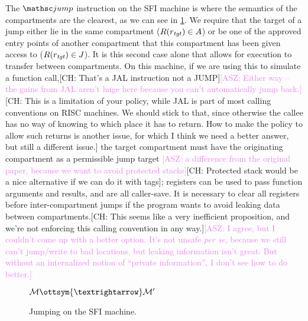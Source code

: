 \documentclass[12pt]{amsart}
\newif\ifdraft\drafttrue
\newcommand{\asz}[1]{\ifdraft\textcolor{violet}{[ASZ: #1]}\fi}
\newcommand*{\latin}[1]{\emph{#1}}
\newcommand{\comm}[3]{\ifdraft\textcolor{#1}{[#2: #3]}\fi}
\newcommand{\ch}[1]{\comm{dkgreen}{CH}{#1}} %
\begin{document}
The $\opcode{jump}$ instruction on the SFI machine is where the semantics of the
compartments are the clearest, as we can see in \cref{fig:sfi-step-jump}.  We
require that the target of a jump either lie in the same compartment
($R(r_{\mathit{tgt}}) \in A$) or be one of the approved
entry points of another compartment that this compartment has been given access
to ($R(r_{\mathit{tgt}}) \in J$).  It is this second case
alone that allows for execution to transfer between compartments.  On this
machine, if we are using this to simulate a function call,\ch{That's a
  JAL instruction not a JUMP}\asz{Either way -- the gains from JAL aren't huge
  here because you can't automatically jump back.}\ch{This is a limitation of
  your policy, while JAL is part of most calling conventions on RISC
  machines.  We should stick to that, since otherwise the callee has no way
  of knowing to which place it has to return. How to make the policy to allow
  such returns is another issue, for which I think we need a better answer,
  but still a different issue.}
the target
compartment must have the originating compartment as a permissible jump target
\asz{a difference from the original paper, because we want to avoid protected
  stacks}\ch{Protected stack would be a nice alternative if we can do
  it with tags};
registers can be used to pass function arguments and results, and are
all caller-save.  It is necessary to clear all registers before
inter-compartment jumps if the program wants to avoid leaking data between
compartments.\ch{This seems like a very inefficient proposition, and
  we're not enforcing this calling convention in any way.}\asz{I agree, but I
  couldn't come up with a better option.  It's not unsafe \latin{per se},
  because we still can't jump/write to bad locations, but leaking information
  isn't great.  But without an internalized notion of ``private information'', I
  don't see how to do better.}

\begin{figure}
  \begin{ottdefnblock}{$\mathcal{M} \ottsym{→} \mathcal{M}'$}
                      {}
    \ottusedrule{\ottdrulestepXXjump{}}
  \end{ottdefnblock}\vspace{-\baselineskip}
  \caption{Jumping on the SFI machine.}
  \label{fig:sfi-step-jump}
\end{figure}
\end{document}
